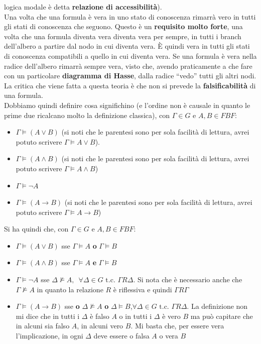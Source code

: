 \documentclass[a4paper,12pt, oneside]{book}
\begin{document}
logica modale è detta \textbf{relazione di accessibilità}).\\
Una volta che una formula è vera in uno stato di conoscenza rimarrà
vero in tutti gli stati di conoscenza che seguono. Questo è un \textbf{requisito
  molto forte}, una volta che una formula diventa vera diventa vera per sempre,
in tutti i branch dell'albero a partire dal nodo in cui diventa vera. È quindi
vera in tutti gli stati di conoscenza compatibili a quello in cui diventa
vera. Se una formula è vera nella radice dell'albero rimarrà sempre vera, visto
che, avendo praticamente a che fare con un particolare \textbf{diagramma di
  Hasse}, dalla radice ``vedo'' tutti gli altri nodi.\\
La critica che viene fatta a questa teoria è che non si prevede la
\textbf{falsificabilità} di una formula. \\
Dobbiamo quindi definire cosa significhino (e l'ordine non è causale in quanto
le prime due ricalcano molto la definizione classica), con $\Gamma\in G$ e
$A,B\in FBF$: 
\begin{itemize}
  \item $\Gamma\vDash (A\lor B)$ (si noti che le parentesi sono per sola
  facilità di lettura, avrei potuto scrivere $\Gamma\vDash A\lor B$). 
  \item $\Gamma\vDash (A\land B)$ (si noti che le parentesi sono per sola
  facilità di lettura, avrei potuto scrivere $\Gamma\vDash A\land B$)
  \item $\Gamma\vDash \neg A$ 
  \item $\Gamma\vDash (A\to B)$ (si noti che le parentesi sono per sola
  facilità di lettura, avrei potuto scrivere $\Gamma\vDash A\to B$)
\end{itemize}
Si ha quindi che, con $\Gamma\in G$ e $A,B\in FBF$:
\begin{itemize}
  \item $\Gamma\vDash (A\lor B)$ sse $\Gamma\vDash A$ \textbf{o} $\Gamma\vDash
  B$  
  \item $\Gamma\vDash (A\land B)$ sse $\Gamma\vDash A$ \textbf{e} $\Gamma\vDash
  B$  
  \item $\Gamma\vDash \neg A$ sse $\Delta\nvDash A,\,\,\,\forall \Delta\in G
  \mbox{ t.c. } \Gamma R\Delta$. Si nota che è necessario anche che
  $\Gamma\nvDash A$ in quanto la relazione $R$ è riflessiva e quindi $\Gamma R
  \Gamma$ 
  \item $\Gamma\vDash (A\to B)$  sse \textbf{o} $\Delta\nvDash A$ \textbf{o}
  $\Delta\vDash B$,$\forall \Delta\in G \mbox{ t.c. } \Gamma R\Delta$. La
  definizione non mi dice che in tutti i $\Delta$ è falso $A$ o in tutti i
  $\Delta$ è vero $B$ ma può capitare che in alcuni sia falso $A$, in alcuni
  vero $B$. Mi basta che, per essere vera l'implicazione, in ogni $\Delta$ deve
  essere o falsa $A$ o vera $B$
\end{itemize}
\end{document}
